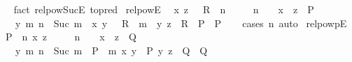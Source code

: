 \begin{isabellebody}
%
\isadelimproof
\ \ %
\endisadelimproof
%
\isatagproof
{}\isamarkupfalse%
\ {\isacharparenleft}{\kern0pt}fact\ relpow{\isacharunderscore}{\kern0pt}Suc{\isacharunderscore}{\kern0pt}E\ {\isacharbrackleft}{\kern0pt}to{\isacharunderscore}{\kern0pt}pred{\isacharbrackright}{\kern0pt}{\isacharparenright}{\kern0pt}%
\endisatagproof
{\isafoldproof}%
%
\isadelimproof
\isanewline
%
\endisadelimproof
\isanewline
{}\isamarkupfalse%
\ relpow{\isacharunderscore}{\kern0pt}E{\isacharcolon}{\kern0pt}\isanewline
\ \ {\isachardoublequoteopen}{\isacharparenleft}{\kern0pt}x{\isacharcomma}{\kern0pt}\ z{\isacharparenright}{\kern0pt}\ {\isasymin}\ \ R\ {\isacharcircum}{\kern0pt}{\isacharcircum}{\kern0pt}\ n\ {\isasymLongrightarrow}\isanewline
\ \ \ \ {\isacharparenleft}{\kern0pt}n\ {\isacharequal}{\kern0pt}\ {}\ {\isasymLongrightarrow}\ x\ {\isacharequal}{\kern0pt}\ z\ {\isasymLongrightarrow}\ P{\isacharparenright}{\kern0pt}\ {\isasymLongrightarrow}\isanewline
\ \ \ \ {\isacharparenleft}{\kern0pt}{\isasymAnd}y\ m{\isachardot}{\kern0pt}\ n\ {\isacharequal}{\kern0pt}\ Suc\ m\ {\isasymLongrightarrow}\ {\isacharparenleft}{\kern0pt}x{\isacharcomma}{\kern0pt}\ y{\isacharparenright}{\kern0pt}\ {\isasymin}\ \ R\ {\isacharcircum}{\kern0pt}{\isacharcircum}{\kern0pt}\ m\ {\isasymLongrightarrow}\ {\isacharparenleft}{\kern0pt}y{\isacharcomma}{\kern0pt}\ z{\isacharparenright}{\kern0pt}\ {\isasymin}\ R\ {\isasymLongrightarrow}\ P{\isacharparenright}{\kern0pt}\ {\isasymLongrightarrow}\ P{\isachardoublequoteclose}\isanewline
%
\isadelimproof
\ \ %
\endisadelimproof
%
\isatagproof
{}\isamarkupfalse%
\ {\isacharparenleft}{\kern0pt}cases\ n{\isacharparenright}{\kern0pt}\ auto%
\endisatagproof
{\isafoldproof}%
%
\isadelimproof
\isanewline
%
\endisadelimproof
\isanewline
{}\isamarkupfalse%
\ relpowp{\isacharunderscore}{\kern0pt}E{\isacharcolon}{\kern0pt}\isanewline
\ \ {\isachardoublequoteopen}{\isacharparenleft}{\kern0pt}P\ {\isacharcircum}{\kern0pt}{\isacharcircum}{\kern0pt}\ n{\isacharparenright}{\kern0pt}\ x\ z\ {\isasymLongrightarrow}\isanewline
\ \ \ \ {\isacharparenleft}{\kern0pt}n\ {\isacharequal}{\kern0pt}\ {}\ {\isasymLongrightarrow}\ x\ {\isacharequal}{\kern0pt}\ z\ {\isasymLongrightarrow}\ Q{\isacharparenright}{\kern0pt}\ {\isasymLongrightarrow}\isanewline
\ \ \ \ {\isacharparenleft}{\kern0pt}{\isasymAnd}y\ m{\isachardot}{\kern0pt}\ n\ {\isacharequal}{\kern0pt}\ Suc\ m\ {\isasymLongrightarrow}\ {\isacharparenleft}{\kern0pt}P\ {\isacharcircum}{\kern0pt}{\isacharcircum}{\kern0pt}\ m{\isacharparenright}{\kern0pt}\ x\ y\ {\isasymLongrightarrow}\ P\ y\ z\ {\isasymLongrightarrow}\ Q{\isacharparenright}{\kern0pt}\ {\isasymLongrightarrow}\ Q{\isachardoublequoteclose}\isanewline

\end{isabellebody}
